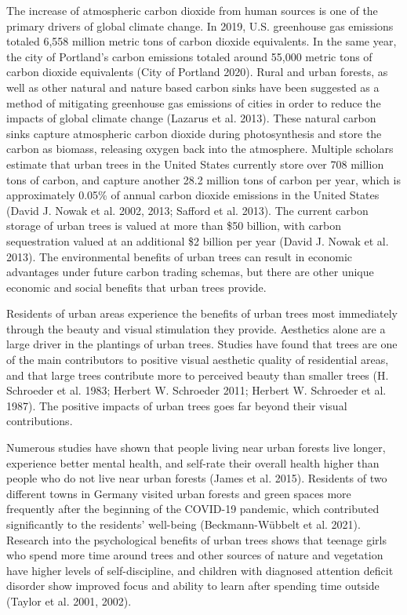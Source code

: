 \documentclass[12pt,twoside]{reedthesis}
\begin{document}
The increase of atmospheric carbon dioxide from human sources is one of
the primary drivers of global climate change. In 2019, U.S. greenhouse
gas emissions totaled 6,558 million metric tons of carbon dioxide
equivalents. In the same year, the city of Portland's carbon emissions
totaled around 55,000 metric tons of carbon dioxide equivalents
(City of Portland 2020). Rural and urban forests, as well as other natural and
nature based carbon sinks have been suggested as a method of mitigating
greenhouse gas emissions of cities in order to reduce the impacts of
global climate change (Lazarus et al. 2013). These natural carbon sinks capture
atmospheric carbon dioxide during photosynthesis and store the carbon as
biomass, releasing oxygen back into the atmosphere. Multiple scholars
estimate that urban trees in the United States currently store over 708
million tons of carbon, and capture another 28.2 million tons of carbon
per year, which is approximately 0.05\% of annual carbon dioxide
emissions in the United States (David J. Nowak et al. 2002, 2013; Safford et al. 2013).
The current carbon storage of urban trees is valued at more than \$50
billion, with carbon sequestration valued at an additional \$2 billion
per year (David J. Nowak et al. 2013). The environmental benefits of urban trees can
result in economic advantages under future carbon trading schemas, but
there are other unique economic and social benefits that urban trees
provide.

Residents of urban areas experience the benefits of urban trees most
immediately through the beauty and visual stimulation they provide.
Aesthetics alone are a large driver in the plantings of urban trees.
Studies have found that trees are one of the main contributors to
positive visual aesthetic quality of residential areas, and that large
trees contribute more to perceived beauty than smaller trees
(H. Schroeder et al. 1983; Herbert W. Schroeder 2011; Herbert W. Schroeder et al. 1987). The positive impacts
of urban trees goes far beyond their visual contributions.

Numerous studies have shown that people living near urban forests live
longer, experience better mental health, and self-rate their overall
health higher than people who do not live near urban forests
(James et al. 2015). Residents of two different towns in Germany visited urban
forests and green spaces more frequently after the beginning of the
COVID-19 pandemic, which contributed significantly to the residents'
well-being (Beckmann-Wübbelt et al. 2021). Research into the psychological
benefits of urban trees shows that teenage girls who spend more time
around trees and other sources of nature and vegetation have higher
levels of self-discipline, and children with diagnosed attention deficit
disorder show improved focus and ability to learn after spending time
outside (Taylor et al. 2001, 2002).
\end{document}
